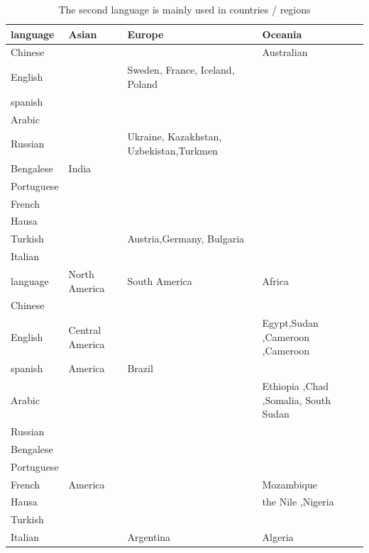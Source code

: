 \begin{table}[H]
	\centering
	\caption{ The second language is mainly used in countries / regions}
	\begin{tabular}{l|l|p{4cm} |p{4cm}}
		\toprule
		language & Asian & Europe & Oceania \\
		\midrule
		Chinese &       &       & Australian \\
		\midrule
		English &       & Sweden, France, Iceland, Poland &  \\	\midrule
		spanish &       &       &  \\	\midrule
		Arabic &       &       &  \\	\midrule
		Russian &       &Ukraine, Kazakhstan, Uzbekistan,Turkmen&  \\	\midrule
		Bengalese & India&       &  \\	\midrule
		Portuguese &       &       &  \\	\midrule
		French &       &       &  \\	\midrule
		Hausa &       &       &  \\	\midrule
		Turkish &       & Austria,Germany, Bulgaria &  \\	\midrule
		Italian &       &       &  \\
		\bottomrule
		\toprule
		language & North America& South America &  Africa \\
		\midrule
		Chinese &       &       &  \\	\midrule
		English & Central America & & Egypt,Sudan ,Cameroon ,Cameroon \\	\midrule
		spanish & \multicolumn{1}{l}{America} & Brazil &  \\	\midrule
		Arabic &       &       & Ethiopia ,Chad ,Somalia, South Sudan \\	\midrule
		Russian &       &       &  \\	\midrule
		Bengalese &       &       &  \\	\midrule
		Portuguese &       &       &  \\	\midrule
		French & America&       & Mozambique \\	\midrule
		Hausa &       &       & the Nile ,Nigeria \\	\midrule
		Turkish &       &       &  \\	\midrule
		Italian &       & Argentina & Algeria \\	\midrule
		\bottomrule
	\end{tabular}%
	\label{tab:addlabel}%
\end{table}%

